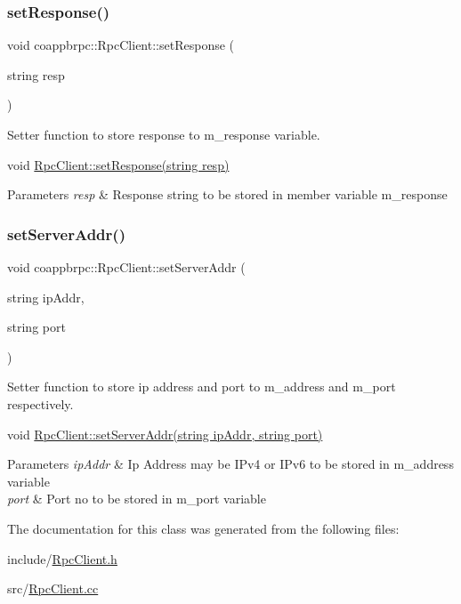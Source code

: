 \subsubsection{\texorpdfstring{set\+Response()}{setResponse()}}
{\footnotesize\ttfamily void coappbrpc\+::\+Rpc\+Client\+::set\+Response (\begin{DoxyParamCaption}\item[{string}]{resp }\end{DoxyParamCaption})}



Setter function to store response to m\+\_\+response variable. 

void \hyperlink{classcoappbrpc_1_1RpcClient_a0f08b63838a62377d4470eb2a0259178}{Rpc\+Client\+::set\+Response(string resp)} 
\begin{DoxyParams}{Parameters}
{\em resp} & Response string to be stored in member variable m\+\_\+response \\
\hline
\end{DoxyParams}
\mbox{\label{classcoappbrpc_1_1RpcClient_a69755d690a7f2d6373e191d359e48986}} 
\subsubsection{\texorpdfstring{set\+Server\+Addr()}{setServerAddr()}}
{\footnotesize\ttfamily void coappbrpc\+::\+Rpc\+Client\+::set\+Server\+Addr (\begin{DoxyParamCaption}\item[{string}]{ip\+Addr,  }\item[{string}]{port }\end{DoxyParamCaption})}



Setter function to store ip address and port to m\+\_\+address and m\+\_\+port respectively. 

void \hyperlink{classcoappbrpc_1_1RpcClient_a69755d690a7f2d6373e191d359e48986}{Rpc\+Client\+::set\+Server\+Addr(string ip\+Addr, string port)} 
\begin{DoxyParams}{Parameters}
{\em ip\+Addr} & Ip Address may be I\+Pv4 or I\+Pv6 to be stored in m\+\_\+address variable \\
\hline
{\em port} & Port no to be stored in m\+\_\+port variable \\
\hline
\end{DoxyParams}


The documentation for this class was generated from the following files\+:\begin{DoxyCompactItemize}
\item 
include/\hyperlink{RpcClient_8h}{Rpc\+Client.\+h}\item 
src/\hyperlink{RpcClient_8cc}{Rpc\+Client.\+cc}\end{DoxyCompactItemize}
